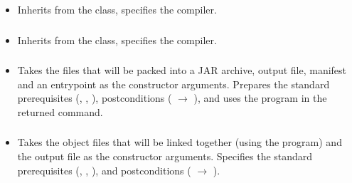 \begin{itemize}[label={}]
    \item Inherits from the \hyperref[subsec:CompileBase]{} class, specifies the 
          compiler.
\end{itemize}

\subsubsection*{}\label{subsec:CompileJava}

\begin{itemize}[label={}]
    \item Inherits from the \hyperref[subsec:CompileBase]{} class, specifies the 
          compiler.
\end{itemize}

\subsubsection*{}\label{subsec:CreateJar}

\begin{itemize}[label={}]
    \item Takes the files that will be packed into a JAR archive, output file, manifest and an entrypoint as the
          constructor arguments.
          Prepares the standard prerequisites
          (\hyperref[subsec:ProgramExistsPrerequisite]{},
          \hyperref[subsec:FileExistsPrerequisite]{},
          \hyperref[subsec:NonEmptyListPrerequisite]{}
          ), postconditions (
          \hyperref[subsec:ExitCodePostcondition]{} $\rightarrow$ 
          ), and uses the  program in the returned command.
\end{itemize}

\subsubsection*{}\label{subsec:Link}

\begin{itemize}[label={}]
    \item Takes the object files that will be linked together (using the  program) and the output file as the
          constructor arguments.
          Specifies the standard prerequisites
          (\hyperref[subsec:ProgramExistsPrerequisite]{},
          \hyperref[subsec:FileExistsPrerequisite]{},
          \hyperref[subsec:NonEmptyListPrerequisite]{}
          ), and postconditions (
          \hyperref[subsec:ExitCodePostcondition]{} $\rightarrow$ 
          ).
\end{itemize}

